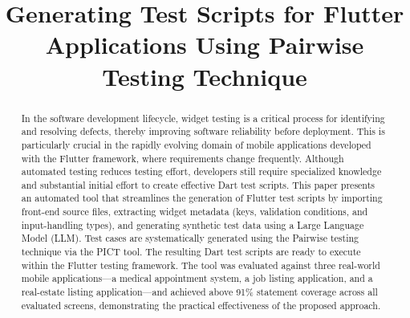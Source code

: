 \documentclass[conference]{IEEEtran}
\begin{document}
\title{Generating Test Scripts for Flutter Applications
       Using Pairwise Testing Technique}

\author{
  \and
}

\maketitle

\begin{abstract}
In the software development lifecycle, widget testing is a critical process
for identifying and resolving defects, thereby improving software
reliability before deployment. This is particularly crucial in the rapidly
evolving domain of mobile applications developed with the Flutter framework,
where requirements change frequently. Although automated testing reduces testing effort, developers still require
specialized knowledge and substantial initial effort to create effective
Dart test scripts. This paper presents an automated tool that streamlines the
generation of Flutter test scripts by importing front-end source files,
extracting widget metadata (keys, validation conditions, and input-handling
types), and generating synthetic test data using a Large Language Model
(LLM). Test cases are systematically generated using the Pairwise testing
technique via the PICT tool. The resulting Dart test scripts are ready to
execute within the Flutter testing framework. The tool was evaluated against
three real-world mobile applications---a medical appointment system, a job
listing application, and a real-estate listing application---and achieved
above 91\% statement coverage across all evaluated screens, demonstrating the
practical effectiveness of the proposed approach.
\end{abstract}
\end{document}
